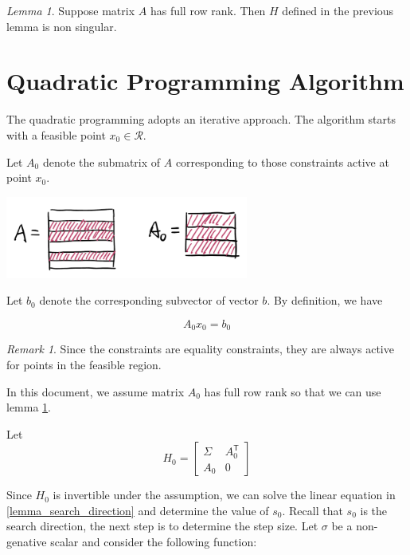 \documentclass[letterpaper, oneside]{book}
\theoremstyle{definition}
\theoremstyle{remark}
\newtheorem*{remark}{Remark}
\newtheorem{lemma}[theorem]{Lemma}
\begin{document}
\begin{lemma}\label{lemma_full_row_rank}
	Suppose matrix $A$ has full row rank. Then $H$ defined in the previous lemma is non singular.
\end{lemma}

\section{Quadratic Programming Algorithm}
The quadratic programming adopts an iterative approach. The algorithm starts with a feasible point $x_0 \in \mathcal{R}$.

Let $A_0$ denote the submatrix of $A$ corresponding to those constraints active at point $x_0$.

\begin{center}
\includegraphics[width=0.6\textwidth]{matrix_a_and_a0_small.png}
\end{center}

Let $b_0$ denote the corresponding subvector of vector $b$. By definition, we have

\begin{displaymath}
	A_0 x_0 = b_0
\end{displaymath}

\begin{remark}
	Since the constraints are equality constraints, they are always active for points in the feasible region.
\end{remark}

In this document, we assume matrix $A_0$ has full row rank so that we can use lemma \ref{lemma_full_row_rank}. 

Let 
\begin{displaymath}
	H_0 = 
	\begin{bmatrix}
		\Sigma{} & A_0^{\mathsf{T}} \\
		A_0 & 0
	\end{bmatrix}	
\end{displaymath}

Since $H_0$ is invertible under the assumption, we can solve the linear equation in \ref{lemma_search_direction} and determine the value of $s_0$. Recall that $s_0$ is the search direction, the next step is to determine the step size. Let $\sigma$ be a non-genative scalar and consider the following function:
\end{document}
